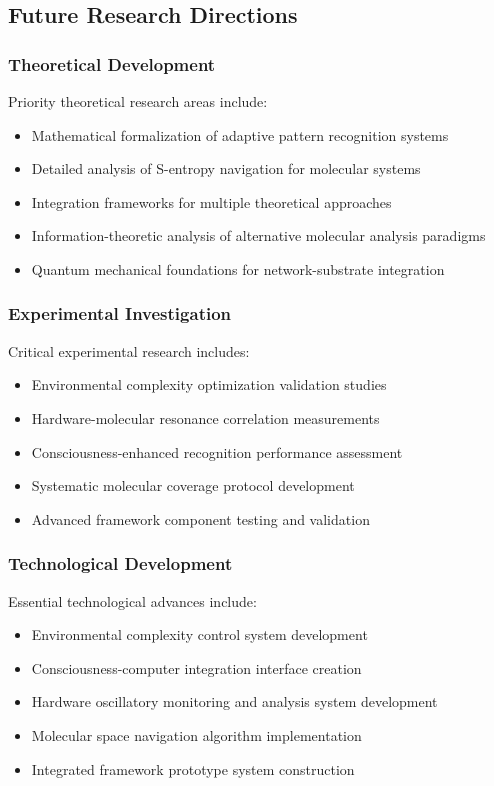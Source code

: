 \documentclass[11pt,a4paper]{article}
\theoremstyle{remark}
\begin{document}
\subsection{Future Research Directions}

\subsubsection{Theoretical Development}

Priority theoretical research areas include:
\begin{itemize}
\item Mathematical formalization of adaptive pattern recognition systems
\item Detailed analysis of S-entropy navigation for molecular systems
\item Integration frameworks for multiple theoretical approaches
\item Information-theoretic analysis of alternative molecular analysis paradigms
\item Quantum mechanical foundations for network-substrate integration
\end{itemize}

\subsubsection{Experimental Investigation}

Critical experimental research includes:
\begin{itemize}
\item Environmental complexity optimization validation studies
\item Hardware-molecular resonance correlation measurements
\item Consciousness-enhanced recognition performance assessment
\item Systematic molecular coverage protocol development
\item Advanced framework component testing and validation
\end{itemize}

\subsubsection{Technological Development}

Essential technological advances include:
\begin{itemize}
\item Environmental complexity control system development
\item Consciousness-computer integration interface creation
\item Hardware oscillatory monitoring and analysis system development
\item Molecular space navigation algorithm implementation
\item Integrated framework prototype system construction
\end{itemize}
\end{document}
